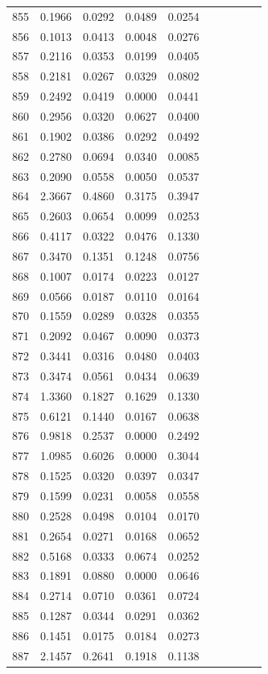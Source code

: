 \begin{table}
\begin{tabular}{cccccccccc}
855& 0.1966& 0.0292& 0.0489& 0.0254\\ 
856& 0.1013& 0.0413& 0.0048& 0.0276\\ 
857& 0.2116& 0.0353& 0.0199& 0.0405\\ 
858& 0.2181& 0.0267& 0.0329& 0.0802\\ 
859& 0.2492& 0.0419& 0.0000& 0.0441\\ 
860& 0.2956& 0.0320& 0.0627& 0.0400\\ 
861& 0.1902& 0.0386& 0.0292& 0.0492\\ 
862& 0.2780& 0.0694& 0.0340& 0.0085\\ 
863& 0.2090& 0.0558& 0.0050& 0.0537\\ 
864& 2.3667& 0.4860& 0.3175& 0.3947\\ 
865& 0.2603& 0.0654& 0.0099& 0.0253\\ 
866& 0.4117& 0.0322& 0.0476& 0.1330\\ 
867& 0.3470& 0.1351& 0.1248& 0.0756\\ 
868& 0.1007& 0.0174& 0.0223& 0.0127\\ 
869& 0.0566& 0.0187& 0.0110& 0.0164\\ 
870& 0.1559& 0.0289& 0.0328& 0.0355\\ 
871& 0.2092& 0.0467& 0.0090& 0.0373\\ 
872& 0.3441& 0.0316& 0.0480& 0.0403\\ 
873& 0.3474& 0.0561& 0.0434& 0.0639\\ 
874& 1.3360& 0.1827& 0.1629& 0.1330\\ 
875& 0.6121& 0.1440& 0.0167& 0.0638\\ 
876& 0.9818& 0.2537& 0.0000& 0.2492\\ 
877& 1.0985& 0.6026& 0.0000& 0.3044\\ 
878& 0.1525& 0.0320& 0.0397& 0.0347\\ 
879& 0.1599& 0.0231& 0.0058& 0.0558\\ 
880& 0.2528& 0.0498& 0.0104& 0.0170\\ 
881& 0.2654& 0.0271& 0.0168& 0.0652\\ 
882& 0.5168& 0.0333& 0.0674& 0.0252\\ 
883& 0.1891& 0.0880& 0.0000& 0.0646\\ 
884& 0.2714& 0.0710& 0.0361& 0.0724\\ 
885& 0.1287& 0.0344& 0.0291& 0.0362\\ 
886& 0.1451& 0.0175& 0.0184& 0.0273\\ 
887& 2.1457& 0.2641& 0.1918& 0.1138\\ 

\end{tabular}
\end{table}

